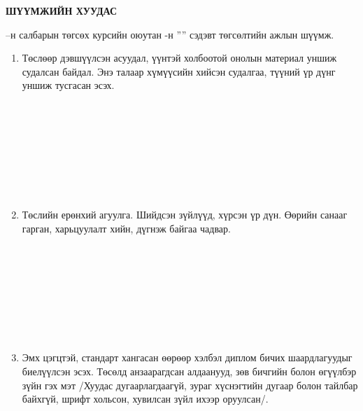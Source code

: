 \begin{titlepage}
\begin{center}

{\scshape\Large \univname\par} %
{\scshape\large \facname\par}\vspace{1cm} %

\textbf{{\Large ШҮҮМЖИЙН ХУУДАС}}\\[1cm]

\end{center}

\normalsize

\deptname --н салбарын төгсөх курсийн оюутан \shortname -н ''\ttitle'' сэдэвт төгсөлтийн ажлын шүүмж.

\begin{enumerate}
\item Төслөөр дэвшүүлсэн асуудал, үүнтэй холбоотой онолын материал уншиж судалсан байдал. Энэ талаар хүмүүсийн хийсэн судалгаа, түүний үр дүнг уншиж тусгасан эсэх.
\begin{center}
\dotfill \\[0.1cm]
\dotfill \\[0.1cm]
\dotfill \\[0.1cm]
\dotfill \\[0.1cm]
\dotfill \\[0.1cm]
\dotfill \\[0.1cm]
\dotfill \\[0.4cm]
\end{center}
\item Төслийн ерөнхий агуулга. Шийдсэн зүйлүүд, хүрсэн үр дүн. Өөрийн санааг гарган, харьцуулалт хийн, дүгнэж байгаа чадвар.
\begin{center}
\dotfill \\[0.1cm]
\dotfill \\[0.1cm]
\dotfill \\[0.1cm]
\dotfill \\[0.1cm]
\dotfill \\[0.1cm]
\dotfill \\[0.1cm]
\dotfill \\[0.4cm]
\end{center}
\item Эмх цэгцтэй, стандарт хангасан өөрөөр хэлбэл диплом бичих шаардлагуудыг биелүүлсэн эсэх. Төсөлд анзаарагдсан алдаанууд, зөв бичгийн болон өгүүлбэр зүйн гэх мэт /Хуудас дугаарлагдаагүй, зураг хүснэгтийн дугаар болон тайлбар байхгүй, шрифт хольсон, хувилсан зүйл ихээр оруулсан/.

\end{enumerate}
\end{titlepage}
